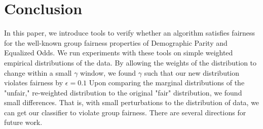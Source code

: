 \documentclass[11pt]{article}
\begin{document}
\section{Conclusion}
In this paper, we introduce tools to verify whether an algorithm satisfies fairness for the well-known group fairness properties of Demographic Parity and Equalized Odds. We run experiments with these tools on simple weighted empirical distributions of the data. By allowing the weights of the distribution to change within a small $\gamma$ window, we found $\gamma$ such that our new distribution violates fairness by $\epsilon = 0.1$ Upon comparing the marginal distributions of the "unfair," re-weighted distribution to the original "fair" distribution, we found small differences. That is, with small perturbations to the distribution of data, we can get our classifier to violate group fairness. There are several directions for future work.
\end{document}
